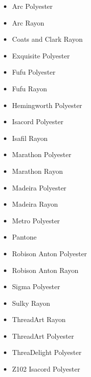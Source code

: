 \begin{itemize}
\item Arc Polyester
\item Arc Rayon
\item Coats and Clark Rayon
\item Exquisite Polyester
\item Fufu Polyester
\item Fufu Rayon
\item Hemingworth Polyester
\item Isacord Polyester
\item Isafil Rayon
\item Marathon Polyester
\item Marathon Rayon
\item Madeira Polyester
\item Madeira Rayon
\item Metro Polyester
\item Pantone
\item Robison Anton Polyester
\item Robison Anton Rayon
\item Sigma Polyester
\item Sulky Rayon
\item ThreadArt Rayon
\item ThreadArt Polyester
\item ThreaDelight Polyester
\item Z102 Isacord Polyester
\end{itemize}
